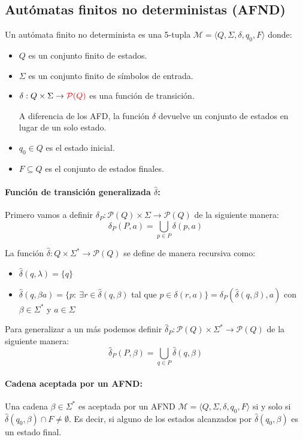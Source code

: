\subsection{Autómatas finitos no deterministas (AFND)}
Un autómata finito no determinista es una 5-tupla \(\mathcal{M}=\langle Q,\Sigma,\delta,q_0,F\rangle\) donde:
\begin{itemize}
  \item \(Q\) es un conjunto finito de estados.
  \item \(\Sigma\) es un conjunto finito de símbolos de entrada.
  \item \(\delta:Q\times\Sigma\to {\color{red}\mathcal{P}(Q)}\) es una función de transición.

        A diferencia de los AFD, la función \(\delta\) devuelve un conjunto de estados en lugar de un solo estado.
  \item \(q_0\in Q\) es el estado inicial.
  \item \(F\subseteq Q\) es el conjunto de estados finales.
\end{itemize}

\paragraph{Función de transición generalizada \(\hat{\delta}\):} Primero vamos a definir \(\delta_P : \mathcal{P}(Q)\times\Sigma\to\mathcal{P}(Q)\) de la siguiente manera:
\[ \delta_P(P,a) = \underset{p\in P}{\bigcup}\delta(p,a)\]

La función \(\hat{\delta} : Q\times\Sigma^*\to \mathcal{P}(Q)\) se define de manera recursiva como:
\begin{itemize}
  \item \(\hat{\delta}(q,\lambda)=\{q\}\)
  \item \(\hat{\delta}(q,\beta a)= \{ p:~\exists r\in\hat{\delta}(q,\beta)\) tal que \(p \in \delta(r, a)\} = \delta_P(\hat{\delta}(q, \beta), a)\) con \(\beta\in\Sigma^*\) y \(a\in\Sigma\)
\end{itemize}

Para generalizar a un más podemos definir \(\hat{\delta}_P : \mathcal{P}(Q)\times\Sigma^*\to\mathcal{P}(Q)\) de la siguiente manera:
\[ \hat{\delta}_P(P,\beta) = \underset{q\in P}{\bigcup}\hat{\delta}(q,\beta)\]

\paragraph{Cadena aceptada por un AFND:} Una cadena \(\beta\in\Sigma^*\) es aceptada por un AFND \(\mathcal{M} = \langle Q, \Sigma, \delta, q_0, F\rangle\) si y solo si \(\hat{\delta}(q_0,\beta)\cap F \neq \emptyset\). Es decir, si alguno de los estados alcanzados por \(\hat{\delta}(q_0,\beta)\) es un estado final.


